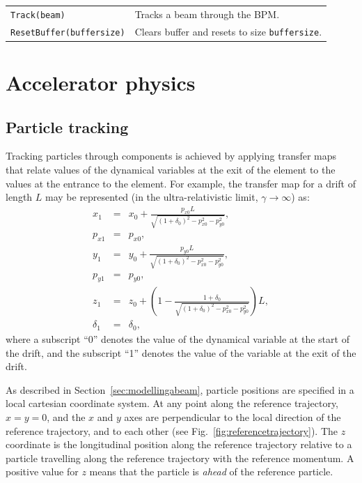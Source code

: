 \documentclass[11pt,twoside,a4paper]{article}
\begin{document}
\begin{tabular}{|l|l|}
\hline
\texttt{Track(beam)} & Tracks a beam through the BPM. \\
\texttt{ResetBuffer(buffersize)} & Clears buffer and resets to size \texttt{buffersize}. \\
\hline
\end{tabular}
\vspace{0.2in}


\section{Accelerator physics}

\subsection{Particle tracking}
Tracking particles through components is achieved by applying transfer maps
that relate values of the dynamical variables at the exit of the element
to the values at the entrance to the element.  For example, the
transfer map for a drift of length $L$ may be represented
(in the ultra-relativistic limit, $\gamma \to \infty$) as:
\begin{eqnarray*}
x_1      & = & x_0 + \frac{p_{x0} L}{\sqrt{(1+\delta_0)^2 - p_{x0}^2 - p_{y0}^2}}, \\
p_{x1}   & = & p_{x0}, \\
y_1      & = & y_0 + \frac{p_{y0} L}{\sqrt{(1+\delta_0)^2 - p_{x0}^2 - p_{y0}^2}}, \\
p_{y1}   & = & p_{y0}, \\
z_1      & = & z_0 + \left( 1 - \frac{1+\delta_0}{\sqrt{(1+\delta_0)^2 - p_{x0}^2 - p_{y0}^2}} \right) L, \\
\delta_1 & = & \delta_0,
\end{eqnarray*}
where a subscript ``0'' denotes the value of the dynamical variable at the
start of the drift, and the subscript ``1'' denotes the value of the variable
at the exit of the drift.

As described in Section~\ref{sec:modellingabeam}, particle positions are specified
in a local cartesian coordinate system. At any point along the reference
trajectory, $x = y = 0$, and the $x$ and $y$ axes are perpendicular to the
local direction of the reference trajectory, and to each other (see
Fig.~\ref{fig:referencetrajectory}).  The $z$ coordinate is the longitudinal position
along the reference trajectory relative to a particle travelling along the reference
trajectory with the reference momentum.  A positive value for $z$ means that the
particle is \emph{ahead} of the reference particle.
\end{document}
